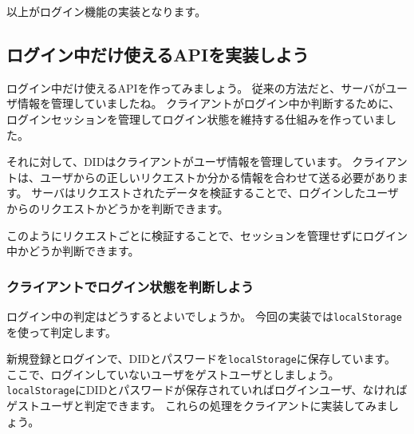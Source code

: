 以上がログイン機能の実装となります。

\subsection{ログイン中だけ使えるAPIを実装しよう}\label{ux30edux30b0ux30a4ux30f3ux4e2dux3060ux3051ux4f7fux3048ux308bapiux3092ux5b9fux88c5ux3057ux3088ux3046}

ログイン中だけ使えるAPIを作ってみましょう。
従来の方法だと、サーバがユーザ情報を管理していましたね。
クライアントがログイン中か判断するために、ログインセッションを管理してログイン状態を維持する仕組みを作っていました。

それに対して、DIDはクライアントがユーザ情報を管理しています。
クライアントは、ユーザからの正しいリクエストか分かる情報を合わせて送る必要があります。
サーバはリクエストされたデータを検証することで、ログインしたユーザからのリクエストかどうかを判断できます。

このようにリクエストごとに検証することで、セッションを管理せずにログイン中かどうか判断できます。

\subsubsection{クライアントでログイン状態を判断しよう}\label{ux30afux30e9ux30a4ux30a2ux30f3ux30c8ux3067ux30edux30b0ux30a4ux30f3ux72b6ux614bux3092ux5224ux65adux3057ux3088ux3046}

ログイン中の判定はどうするとよいでしょうか。
今回の実装では\texttt{localStorage}を使って判定します。

新規登録とログインで、DIDとパスワードを\texttt{localStorage}に保存しています。
ここで、ログインしていないユーザをゲストユーザとしましょう。
\texttt{localStorage}にDIDとパスワードが保存されていればログインユーザ、なければゲストユーザと判定できます。
これらの処理をクライアントに実装してみましょう。

\begin{Shaded}
\begin{Highlighting}[]
 \NormalTok{() \{}
  \OperatorTok{=}\NormalTok{(}\NormalTok{)}\OperatorTok{;}
  \OperatorTok{=}\NormalTok{(}\NormalTok{)}\OperatorTok{;}

  \OperatorTok{===}  \OperatorTok{||}\OperatorTok{===} \OperatorTok{;}
\NormalTok{\}}
\end{Highlighting}
\end{Shaded}


